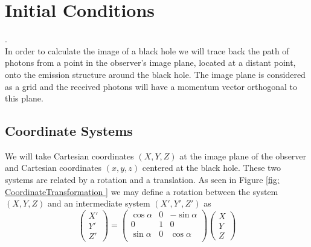 
\chapter{Initial Conditions}.\\

In order to calculate the image of a black hole we will trace back the path of photons from a point in the observer's image plane, located at a distant point, onto the emission structure around the black hole. The image plane is considered as a grid and the received photons will have a momentum vector orthogonal to this plane.\\

\section{Coordinate Systems}
We will take Cartesian coordinates $(X,Y,Z)$ at the image plane of the observer and Cartesian coordinates $(x,y,z)$ centered at the black hole. These two systems are related  by a rotation and a translation. As seen in Figure \ref{fig: CoordinateTransformation } we may define a rotation between the system $(X,Y,Z)$ and an intermediate system $(X',Y',Z')$ as
\begin{equation}
\begin{pmatrix}
X' \\
Y' \\
Z'
\end{pmatrix} =
\begin{pmatrix}
\cos \alpha & 0 &-\sin\alpha \\
0 & 1 &0\\
\sin \alpha &  0 & \cos \alpha\\
\end{pmatrix} 
\begin{pmatrix}
X\\
Y\\
Z
\end{pmatrix}
\end{equation}

